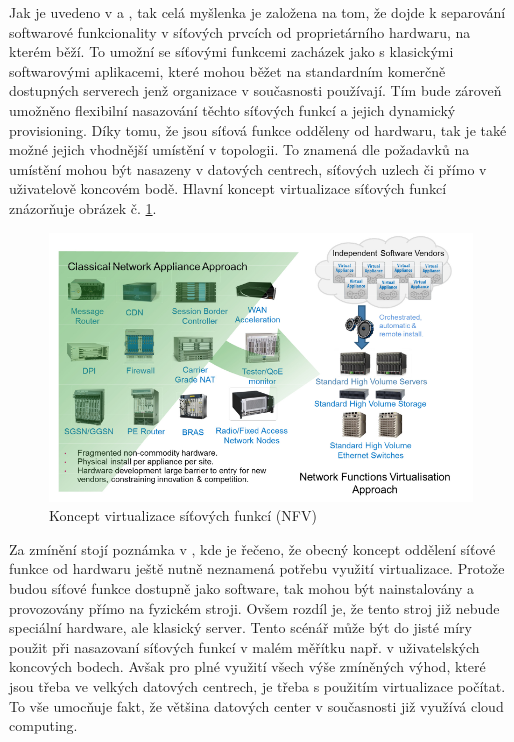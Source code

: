 Jak je uvedeno v \cite{NFVState} a \cite{NFVChalanges}, tak celá myšlenka je založena na tom, že dojde k separování softwarové funkcionality v síťových prvcích od proprietárního hardwaru, na kterém běží. To umožní se síťovými funkcemi zacházek jako s klasickými softwarovými aplikacemi, které mohou běžet na standardním komerčně dostupných serverech jenž organizace v současnosti používají. Tím bude zároveň umožněno flexibilní nasazování těchto síťových funkcí a jejich dynamický provisioning. Díky tomu, že jsou síťová funkce odděleny od hardwaru, tak je také možné jejich vhodnější umístění v topologii. To znamená dle požadavků na umístění mohou být nasazeny v datových centrech, síťových uzlech či přímo v uživatelově koncovém bodě. Hlavní koncept virtualizace síťových funkcí znázorňuje obrázek č. \ref{fig:vize_NFV}. 

\begin{figure}[h]
\begin{centering}
\includegraphics[scale=0.5]{images/vize_NFV}
\par\end{centering}
\caption{Koncept virtualizace síťových funkcí (NFV)\label{fig:vize_NFV}}
\end{figure}

Za zmínění stojí poznámka v \cite{NFVState}, kde je řečeno, že obecný koncept oddělení síťové funkce od hardwaru ještě nutně neznamená potřebu využití virtualizace. Protože budou síťové funkce dostupně jako software, tak mohou být nainstalovány a provozovány přímo na fyzickém stroji. Ovšem rozdíl je, že tento stroj již nebude speciální hardware, ale klasický server. Tento scénář může být do jisté míry použit při nasazovaní síťových funkcí v malém měřítku např. v uživatelských koncových bodech. Avšak pro plné využití všech výše zmíněných výhod, které jsou třeba ve velkých datových centrech, je třeba s použitím virtualizace počítat. To vše umocňuje fakt, že většina datových center v současnosti již využívá cloud computing. 

